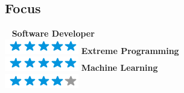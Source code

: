 \documentclass[]{friggeri-cv}
\begin{document}
\begin{aside}
    \section{Focus}
    ~
    \textbf{Software Developer\\}\includegraphics[scale=0.40]{img/5stars.png}
    \textbf{Extreme Programming\\}\includegraphics[scale=0.40]{img/5stars.png}
     \textbf{Machine Learning\\}\includegraphics[scale=0.40]{img/4stars.png}
    ~
\end{aside}
\end{document}
